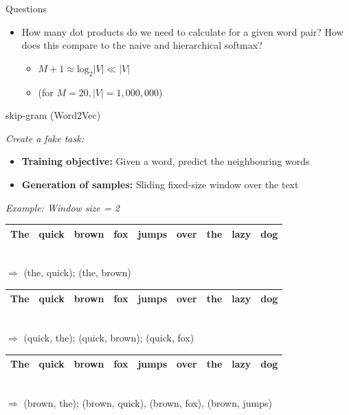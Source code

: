 \documentclass[11pt,compress,t,notes=noshow, xcolor=table]{beamer}
\begin{document}

\begin{vbframe}{Questions}

\vfill

\begin{itemize}
	\item \ques How many dot products do we need to calculate for a given word pair? How does this compare to the naive and hierarchical softmax?
		\begin{itemize}
			\item $M+1 \approx \mathrm{log}_2 |V| \ll |V|$
			\item[] (for $M=20, |V| = 1,000,000$)
		\end{itemize}
\end{itemize}

\vfill

\end{vbframe}


\begin{vbframe}{skip-gram (Word2Vec)}

\vfill

\textit{Create a fake task:}

\begin{itemize}
	\item \textbf{Training objective:} Given a word, predict the neighbouring words
	\item \textbf{Generation of samples:} Sliding fixed-size window over the text
\end{itemize}

\textit{Example: Window size = 2}

\medskip

\begin{tabular}{|c|c|c|cccccc|}
\hline
\cellcolor{blue!15}The & \cellcolor{blue!65}quick & \cellcolor{blue!65}brown & fox & jumps & over & the & lazy & dog \\
\hline
\end{tabular}\\
$\Rightarrow$ \qquad (the, quick); (the, brown)
\begin{tabular}{|c|c|c|c|ccccc|}
\hline
\cellcolor{blue!65}The & \cellcolor{blue!15}quick & \cellcolor{blue!65}brown & \cellcolor{blue!65}fox & jumps & over & the & lazy & dog \\
\hline
\end{tabular}\\
$\Rightarrow$ \qquad (quick, the); (quick, brown); (quick, fox)
\begin{tabular}{|c|c|c|c|c|cccc|}
\hline
\cellcolor{blue!65}The & \cellcolor{blue!65}quick & \cellcolor{blue!15}brown & \cellcolor{blue!65}fox & \cellcolor{blue!65}jumps & over & the & lazy & dog \\
\hline
\end{tabular}\\
$\Rightarrow$ \qquad (brown, the); (brown, quick), (brown, fox), (brown, jumps)

\vfill

\end{vbframe}
\end{document}
